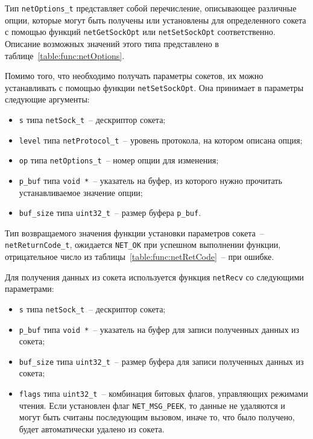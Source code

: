 
Тип \lstinline{netOptions_t} представляет собой перечисление, описывающее различные
опции, которые могут быть получены или установлены для определенного сокета
с помощью функций \lstinline{netGetSockOpt} или \lstinline{netSetSockOpt}
соответственно. Описание возможных значений этого типа представлено в таблице~\ref{table:func:netOptions}.

Помимо того, что необходимо получать параметры сокетов, их можно устанавливать с помощью функции \lstinline{netSetSockOpt}. Она принимает в параметры следующие аргументы:

\begin{itemize}
    \item \lstinline{s} типа \lstinline{netSock_t}~-- дескриптор сокета;
    \item \lstinline{level} типа \lstinline{netProtocol_t}~-- уровень протокола, на котором описана опция;
    \item \lstinline{op} типа \lstinline{netOptions_t}~-- номер опции для изменения;
    \item \lstinline{p_buf} типа \lstinline{void *}~-- указатель на буфер, из которого нужно прочитать устанавливаемое значение опции;
    \item \lstinline{buf_size} типа \lstinline{uint32_t}~-- размер буфера \lstinline{p_buf}.
\end{itemize}

Тип возвращаемого значения функции установки параметров сокета~-- \lstinline{netReturnCode_t}, ожидается \lstinline{NET_OK} при успешном выполнении функции,
отрицательное число из таблицы~\ref{table:func:netRetCode}~-- при ошибке.

Для получения данных из сокета используется функция \lstinline{netRecv} со следующими параметрами:

\begin{itemize}
    \item \lstinline{s} типа \lstinline{netSock_t}~-- дескриптор сокета;
    \item \lstinline{p_buf} типа \lstinline{void *}~-- указатель на буфер для записи полученных данных из сокета;
    \item \lstinline{buf_size} типа \lstinline{uint32_t}~-- размер буфера для записи полученных данных из сокета;
    \item \lstinline{flags} типа \lstinline{uint32_t}~-- комбинация битовых флагов, управляющих режимами чтения. Если установлен флаг \lstinline{NET_MSG_PEEK}, то данные не удаляются и могут быть считаны последующим вызовом, иначе то, что было получено, будет автоматически удалено из сокета.
\end{itemize}

